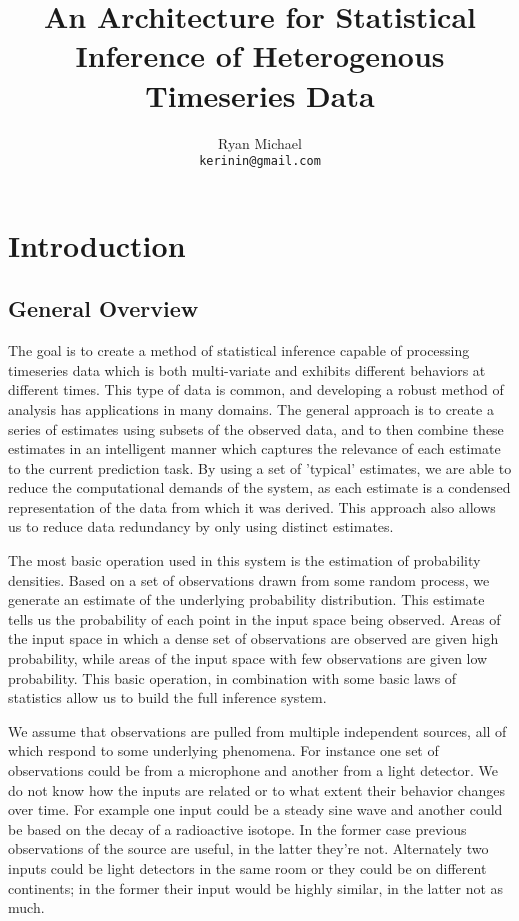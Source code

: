 \documentclass[10pt]{article}
\begin{document}
\title{An Architecture for Statistical Inference of Heterogenous Timeseries Data}
\author{Ryan Michael\\ \texttt{kerinin@gmail.com}}
\maketitle


\section{Introduction}

\subsection{General Overview}
The goal is to create a method of statistical inference capable of processing timeseries data which is both multi-variate and exhibits different behaviors at different times.  This type of data is common, and developing a robust method of analysis has applications in many domains.  The general approach is to create a series of estimates using subsets of the observed data, and to then combine these estimates in an intelligent manner which captures the relevance of each estimate to the current prediction task.  By using a set of 'typical' estimates, we are able to reduce the computational demands of the system, as each estimate is a condensed representation of the data from which it was derived.  This approach also allows us to reduce data redundancy by only using distinct estimates.

The most basic operation used in this system is the estimation of probability densities.  Based on a set of observations drawn from some random process, we generate an estimate of the underlying probability distribution.  This estimate tells us the probability of each point in the input space being observed.  Areas of the input space in which a dense set of observations are observed are given high probability, while areas of the input space with few observations are given low probability.  This basic operation, in combination with some basic laws of statistics allow us to build the full inference system.

We assume that observations are pulled from multiple independent sources, all of which respond to some underlying phenomena.  For instance one set of observations could be from a microphone and another from a light detector.  We do not know how the inputs are related or to what extent their behavior changes over time.  For example one input could be a steady sine wave and another could be based on the decay of a radioactive isotope.  In the former case previous observations of the source are useful, in the latter they're not.  Alternately two inputs could be light detectors in the same room or they could be on different continents; in the former their input would be highly similar, in the latter not as much.
\end{document}
